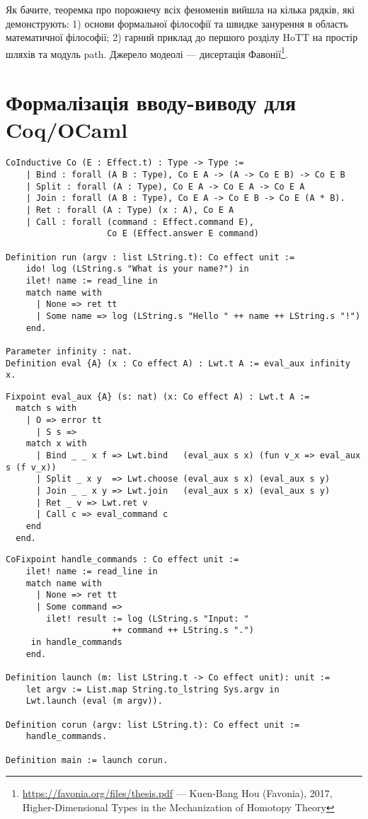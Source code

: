 Як бачите, теоремка про порожнечу всіх феноменів вийшла на кілька рядків,
які демонструють: 1) основи формальної філософії та швидке занурення в
область математичної філософії; 2) гарний приклад до першого розділу
HoTT на простір шляхів та модуль path. Джерело модеолі --- дисертація
Фавонії\footnote{\url{https://favonia.org/files/thesis.pdf} --- Kuen-Bang
Hou (Favonia), 2017, Higher-Dimensional Types in the Mechanization of Homotopy Theory}.

\newpage
\section{Формалізація вводу-виводу для Coq/OCaml}

\begin{lstlisting}
CoInductive Co (E : Effect.t) : Type -> Type :=
    | Bind : forall (A B : Type), Co E A -> (A -> Co E B) -> Co E B
    | Split : forall (A : Type), Co E A -> Co E A -> Co E A
    | Join : forall (A B : Type), Co E A -> Co E B -> Co E (A * B).
    | Ret : forall (A : Type) (x : A), Co E A
    | Call : forall (command : Effect.command E),
                    Co E (Effect.answer E command)

Definition run (argv : list LString.t): Co effect unit :=
    ido! log (LString.s "What is your name?") in
    ilet! name := read_line in
    match name with
      | None => ret tt
      | Some name => log (LString.s "Hello " ++ name ++ LString.s "!")
    end.

Parameter infinity : nat.
Definition eval {A} (x : Co effect A) : Lwt.t A := eval_aux infinity x.
\end{lstlisting}

\begin{lstlisting}
Fixpoint eval_aux {A} (s: nat) (x: Co effect A) : Lwt.t A :=
  match s with
    | O => error tt
      | S s =>
    match x with
      | Bind _ _ x f => Lwt.bind   (eval_aux s x) (fun v_x => eval_aux s (f v_x))
      | Split _ x y  => Lwt.choose (eval_aux s x) (eval_aux s y)
      | Join _ _ x y => Lwt.join   (eval_aux s x) (eval_aux s y)
      | Ret _ v => Lwt.ret v
      | Call c => eval_command c
    end
  end.
\end{lstlisting}

\begin{lstlisting}
CoFixpoint handle_commands : Co effect unit :=
    ilet! name := read_line in
    match name with
      | None => ret tt
      | Some command =>
        ilet! result := log (LString.s "Input: "
                     ++ command ++ LString.s ".")
     in handle_commands
    end.

Definition launch (m: list LString.t -> Co effect unit): unit :=
    let argv := List.map String.to_lstring Sys.argv in
    Lwt.launch (eval (m argv)).

Definition corun (argv: list LString.t): Co effect unit :=
    handle_commands.

Definition main := launch corun.
\end{lstlisting}

